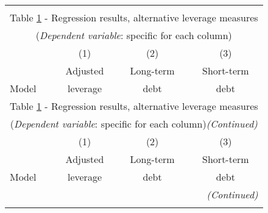 \begin{longtable}{lccc}\\
		\label{reg:alternative}\\
\multicolumn{4}{c}{Table \ref{reg:alternative} - Regression results, alternative leverage measures} \\
	\multicolumn{4}{c}{(\textit{Dependent variable}: specific for each column)}\\ \hline \hline
 & (1) & (2) & (3) \\ 
  & Adjusted & Long-term & Short-term \\
 Model & leverage & debt & debt \\ \hline\endfirsthead
 
 \multicolumn{4}{c}{Table \ref{reg:alternative} - Regression results, alternative leverage measures} \\
 \multicolumn{4}{c}{(\textit{Dependent variable}: specific for each column)\textit{(Continued)}}\\ \hline \hline
 & (1) & (2) & (3) \\ 
  & Adjusted & Long-term & Short-term \\
 Model & leverage & debt & debt \\ \hline\endhead
 
  \hline
 \multicolumn{4}{r}{{\textit{(Continued)}}}\\ \endfoot
 
 \endlastfoot
 


\end{longtable}
